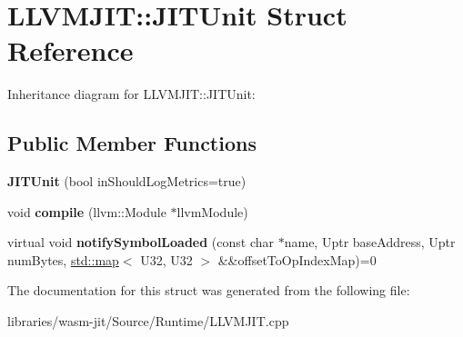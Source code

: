 \hypertarget{struct_l_l_v_m_j_i_t_1_1_j_i_t_unit}{}\section{L\+L\+V\+M\+J\+IT\+:\+:J\+I\+T\+Unit Struct Reference}
\label{struct_l_l_v_m_j_i_t_1_1_j_i_t_unit}


Inheritance diagram for L\+L\+V\+M\+J\+IT\+:\+:J\+I\+T\+Unit\+:
\subsection*{Public Member Functions}
\begin{DoxyCompactItemize}
\item 
\mbox{\label{struct_l_l_v_m_j_i_t_1_1_j_i_t_unit_ac96d35e5bc8e4ddc48e1c4bbb8188ff0}} 
{\bfseries J\+I\+T\+Unit} (bool in\+Should\+Log\+Metrics=true)
\item 
\mbox{\label{struct_l_l_v_m_j_i_t_1_1_j_i_t_unit_ad1d82d4c14135f51f2040306c3bc3908}} 
void {\bfseries compile} (llvm\+::\+Module $\ast$llvm\+Module)
\item 
\mbox{\label{struct_l_l_v_m_j_i_t_1_1_j_i_t_unit_acffc5304e98412f08f2a89ab2e6a9fea}} 
virtual void {\bfseries notify\+Symbol\+Loaded} (const char $\ast$name, Uptr base\+Address, Uptr num\+Bytes, \mbox{\hyperlink{classstd_1_1map}{std\+::map}}$<$ U32, U32 $>$ \&\&offset\+To\+Op\+Index\+Map)=0
\end{DoxyCompactItemize}


The documentation for this struct was generated from the following file\+:\begin{DoxyCompactItemize}
\item 
libraries/wasm-\/jit/\+Source/\+Runtime/L\+L\+V\+M\+J\+I\+T.\+cpp\end{DoxyCompactItemize}
